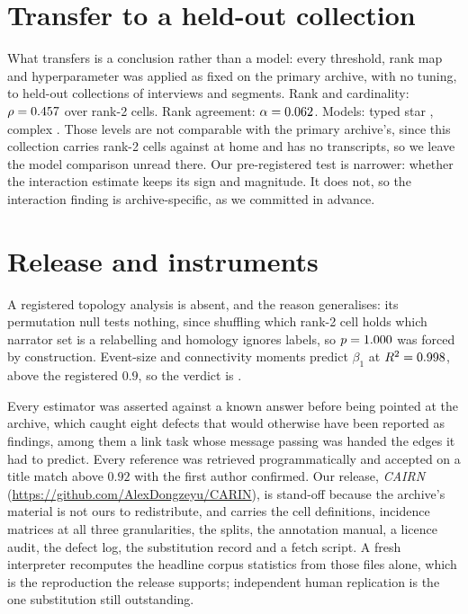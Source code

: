 \documentclass[conference]{IEEEtran}
\newcommand{\repoURL}{https://github.com/AlexDongzeyu/CARIN}
\begin{document}
\section{Transfer to a held-out collection}

What transfers is a conclusion rather than a model: every threshold, rank map
and hyperparameter was applied as fixed on the primary archive, with no tuning, to
held-out
collections of \transferInterviews{} interviews and \transferSegments{} segments. Rank and
cardinality: $\rho = 0.457{}$ over \transferCells{} rank-2 cells. Rank agreement:
$\alpha = 0.062{}$. Models: typed star \transferMthree{}, complex
\transferMfive{}. Those levels are not comparable with the primary archive's, since this
collection carries \transferCells{} rank-2 cells against \nRankTwoCells{} at home and has no
transcripts, so we leave the model comparison unread there. Our
pre-registered test is narrower: whether the interaction estimate keeps its sign and
magnitude. It does not, so the interaction finding is archive-specific, as we committed in
advance.

\section{Release and instruments}

A registered topology analysis is absent, and the reason generalises: its permutation null
tests nothing, since shuffling which
rank-2 cell holds which narrator set is a relabelling and homology ignores labels, so
$p = 1.000{}$ was forced by construction. Event-size and connectivity moments predict
$\beta_1$ at $R^2 = 0.998{}$, above the registered $0.9$, so the verdict is
\topoKeep{}.

Every estimator was asserted against a known answer before being pointed at the archive,
which caught eight defects that would otherwise have been reported as findings, among them a
link task whose message passing was handed the edges it had to predict. Every
reference was retrieved programmatically and accepted on a title match above $0.92$ with
the first author confirmed. Our release, \emph{CAIRN} (\url{\repoURL}), is stand-off because
the archive's
material is not ours to redistribute, and carries the cell definitions, incidence matrices at
all three granularities, the splits, the annotation manual, a licence audit, the defect log,
the substitution record and a fetch script.
A fresh interpreter recomputes the headline corpus statistics from those files alone, which is
the reproduction the release supports; independent human replication is the one substitution
still outstanding.
\end{document}
